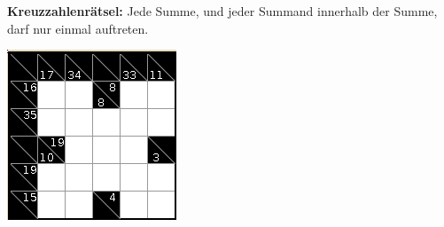 \documentclass[twoside,12pt,parskip=half-]{scrartcl}
\begin{document}
\begin{multicols}{2}
\bigskip
\textbf{Kreuzzahlenrätsel:} Jede Summe, und jeder Summand innerhalb der Summe, darf nur einmal auftreten.

\includegraphics[width=0.9\linewidth]{2011-10-02-134837_191x192_scrot.png}

\end{multicols}

\clearpage
\end{document}
